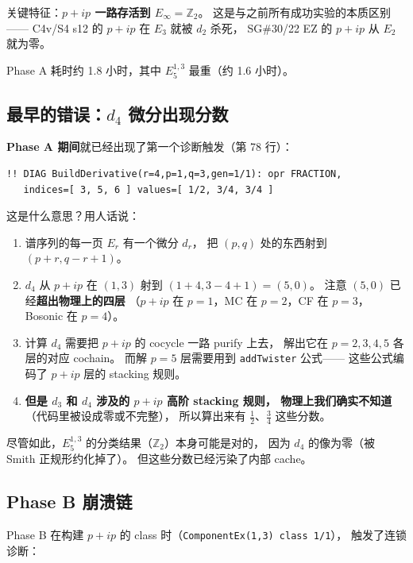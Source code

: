 \documentclass[a4paper,fontset=ubuntu,12pt]{ctexart}
\begin{document}
关键特征：\textbf{$p{+}ip$ 一路存活到 $E_\infty = \mathbb{Z}_2$}。
这是与之前所有成功实验的本质区别——
C4v/S4 s12 的 $p{+}ip$ 在 $E_3$ 就被 $d_2$ 杀死，
SG\#30/22 EZ 的 $p{+}ip$ 从 $E_2$ 就为零。

Phase A 耗时约 1.8 小时，其中 $E^{1,3}_5$ 最重（约 1.6 小时）。

\subsection{最早的错误：$d_4$ 微分出现分数}

\textbf{Phase A 期间}就已经出现了第一个诊断触发（第 78 行）：
\begin{verbatim}
!! DIAG BuildDerivative(r=4,p=1,q=3,gen=1/1): opr FRACTION,
   indices=[ 3, 5, 6 ] values=[ 1/2, 3/4, 3/4 ]
\end{verbatim}

这是什么意思？用人话说：

\begin{enumerate}
\item 谱序列的每一页 $E_r$ 有一个微分 $d_r$，
      把 $(p,q)$ 处的东西射到 $(p+r, q-r+1)$。
\item $d_4$ 从 $p{+}ip$ 在 $(1,3)$ 射到 $(1+4, 3-4+1) = (5, 0)$。
      注意 $(5,0)$ 已经\textbf{超出物理上的四层}
      （$p{+}ip$ 在 $p=1$，MC 在 $p=2$，CF 在 $p=3$，Bosonic 在 $p=4$）。
\item 计算 $d_4$ 需要把 $p{+}ip$ 的 cocycle 一路 purify 上去，
      解出它在 $p=2,3,4,5$ 各层的对应 cochain。
      而解 $p=5$ 层需要用到 \texttt{addTwister} 公式——
      这些公式编码了 $p{+}ip$ 层的 stacking 规则。
\item \textbf{但是 $d_3$ 和 $d_4$ 涉及的 $p{+}ip$ 高阶 stacking 规则，
      物理上我们确实不知道}（代码里被设成零或不完整），
      所以算出来有 $\frac{1}{2}$、$\frac{3}{4}$ 这些分数。
\end{enumerate}

尽管如此，$E^{1,3}_5$ 的分类结果（$\mathbb{Z}_2$）本身可能是对的，
因为 $d_4$ 的像为零（被 Smith 正规形约化掉了）。
但这些分数已经污染了内部 cache。

\subsection{Phase B 崩溃链}

Phase B 在构建 $p{+}ip$ 的 class 时（\texttt{ComponentEx(1,3) class 1/1}），
触发了连锁诊断：
\end{document}
